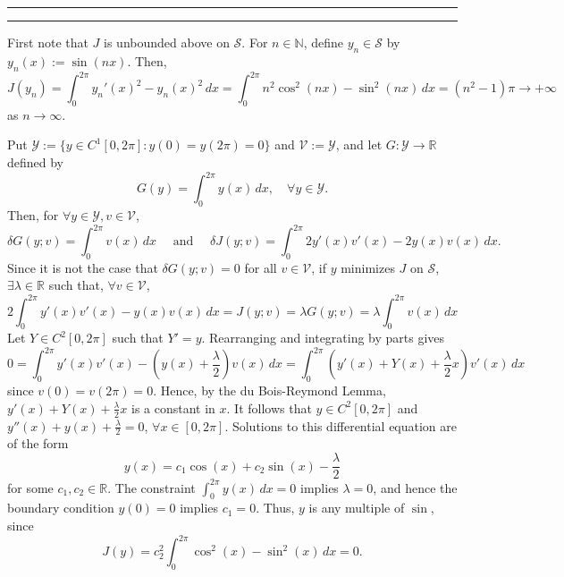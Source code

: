 \documentclass[11pt]{article}
\newcounter{questionCounter}
\newcounter{partCounter}[questionCounter]
\newenvironment{question}[2][\arabic{questionCounter}]{%
    \setcounter{partCounter}{0}%
    \vspace{.25in} \hrule \vspace{0.5em}%
        \noindent{\bf #2}%
    \vspace{0.8em} \hrule \vspace{.10in}%
    \addtocounter{questionCounter}{1}%
}{}
\newcommand{\N}{\mathbb{N}}             %
\newcommand{\R}{\mathbb{R}}             %
\renewcommand{\S}{\mathscr{S}}          %
\newcommand{\Y}{\mathscr{Y}}            %
\newcommand{\V}{\mathscr{V}}            %
\begin{document}
\begin{question}{Problem 4}
First note that $J$ is unbounded above on $\S$. For $n \in \N$, define
$y_n \in \S$ by $y_n(x) := \sin(nx)$. Then,
\[J(y_n)
    = \int_0^{2\pi} y_n'(x)^2 - y_n(x)^2 \, dx
    = \int_0^{2\pi} n^2\cos^2(nx) - \sin^2(nx) \, dx
    = (n^2 - 1)\pi
    \to +\infty
\]
as $n \to \infty$. 

Put $\Y := \{y \in C^1[0,2\pi] : y(0) = y(2\pi) = 0\}$ and $\V := \Y$, and let
$G : \Y \to \R$ defined by
\[G(y) = \int_0^{2\pi} y(x) \, dx, \quad \forall y \in \Y.\]
Then, for
$\forall y  \in \Y, v \in \V$,
\[\delta G(y;v)
    = \int_0^{2\pi} v(x) \, dx
    \quad \mbox{ and } \quad
  \delta J(y;v)
    = \int_0^{2\pi} 2y'(x)v'(x) - 2y(x)v(x) \, dx.
\]
Since it is not the case that $\delta G(y;v) = 0$ for all $v \in \V$, if $y$
minimizes $J$ on $\S$, $\exists \lambda \in \R$ such that,
$\forall v \in \V$,
\[2\int_0^{2\pi} y'(x)v'(x) - y(x)v(x) \, dx
    = J(y;v)
    = \lambda G(y;v)
    = \lambda\int_0^{2\pi} v(x) \, dx
\]
Let $Y \in C^2[0,2\pi]$ such that $Y' = y$. Rearranging and integrating by
parts gives
\[0
    = \int_0^{2\pi} y'(x)v'(x)
        - \left(y(x) + \frac{\lambda}{2}\right) v(x) \, dx
    = \int_0^{2\pi} \left( y'(x)
        + Y(x) + \frac{\lambda}{2}x\right) v'(x) \, dx
\]
since $v(0) = v(2\pi) = 0$. Hence, by the du Bois-Reymond Lemma,
$y'(x) + Y(x) + \frac{\lambda}{2}x$ is a constant in $x$. It follows that
$y \in C^2[0,2\pi]$ and $y''(x) + y(x) + \frac{\lambda}{2} = 0$,
$\forall x \in [0,2\pi]$. Solutions to this differential equation are of the
form
\[y(x) = c_1 \cos(x) + c_2\sin(x) - \frac{\lambda}{2}\]
for some $c_1,c_2 \in \R$. The constraint $\int_0^{2\pi} y(x) \, dx = 0$
implies $\lambda = 0$, and hence the boundary condition $y(0) = 0$ implies
$c_1 = 0$. Thus, $y$ is any multiple of $\sin$, since
\[J(y) = c_2^2\int_0^{2\pi} \cos^2(x) - \sin^2(x) \, dx = 0.\]
\end{question}
\end{document}
